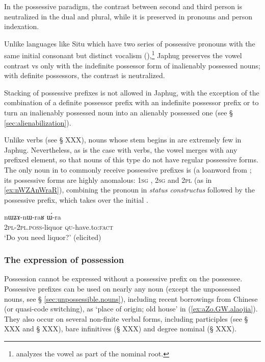 In the possessive paradigm, the contrast between second and third person is neutralized in the dual and plural, while it is preserved in pronouns and person indexation.

Unlike languages like Situ which have two series of possessive pronouns with the same initial consonant but distinct vocalism (\citealt[168-169]{linxr93jiarongen}),\footnote{\citet[118-119]{prins16kyomkyo} analyzes the vowel as part of the nominal root.} Japhug preserves the vowel contrast  vs  only with the indefinite possessor form of inalienably possessed nouns; with definite possessors, the contrast is neutralized.

Stacking of possessive prefixes is not allowed in Japhug, with the exception of the combination of a definite possessor prefix with an indefinite possessor prefix  or  to turn an inalienably possessed noun into an alienably possessed one (see § \ref{sec:alienabilization}).

Unlike verbs (see § XXX), nouns whose stem begins in  are extremely few in Japhug. Nevertheless, as is the case with verbs, the vowel  merges with any prefixed element, so that nouns of this type do not have regular possessive forms. The only noun in  to commonly receive possessive prefixes is  (a loanword from ; its possessive forms are highly anomalous: \textsc{1sg} , \textsc{2sg}  and \textsc{2pl}  (as in \ref{ex:nWZAnWraR}), combining the pronoun in \textit{status constructus} followed by the possessive prefix, which takes over the initial .

\begin{exe}
\ex \label{ex:nWZAnWraR}
\gll nɯʑɤ-nɯ-raʁ ɯ́-ra \\
\textsc{2pl}-\textsc{2pl.poss}-liquor \textsc{qu}-have.to:\textsc{fact} \\
\glt `Do you need liquor?' (elicited)
\end{exe}

\subsubsection{The expression of possession} \label{ex:prefix.expression.of.possession}
Possession cannot be expressed without a possessive prefix on the possessee. Possessive prefixes can be used on nearly any noun (except the unpossessed nouns, see § \ref{sec:unpossessible.nouns}), including recent borrowings from Chinese (or quasi-code switching), as   `place of origin; old house' in (\ref{ex:aZo.GW.alaojia}). They also occur on several non-finite verbal forms, including participles (see § XXX and § XXX), bare infinitives (§ XXX) and degree nominal (§ XXX).

